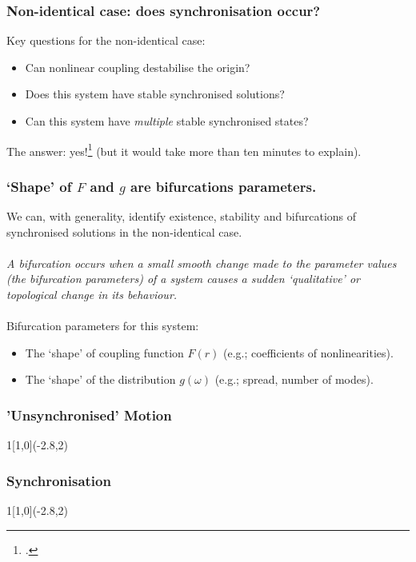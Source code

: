 \documentclass[10pt,reqno]{beamer}
\begin{document}
\begin{frame}
\frametitle{Non-identical case: does synchronisation occur?}
Key questions for the non-identical case:
\begin{itemize}
\item Can nonlinear coupling destabilise the origin?
\item Does this system have stable synchronised solutions?
\item Can this system have {\em multiple} stable synchronised states?
\end{itemize}
\vspace{10pt}
The answer: yes!\footcite{pc2015} (but it would take more than ten minutes to explain).
\end{frame}
\begin{frame}[t]
\frametitle{`Shape' of $F$ and $g$ are bifurcations parameters.}
We can, with generality, identify existence, stability and bifurcations of synchronised solutions in the non-identical case.\\~\\
{\em A bifurcation occurs when a small smooth change made to the parameter values (the bifurcation parameters) of a system causes a sudden `qualitative' or topological change in its behaviour.}
\\~\\
Bifurcation parameters for this system:
\begin{itemize}
\item The `shape' of coupling function $F(r)$ (e.g.; coefficients of nonlinearities).  
\item The `shape' of the distribution $g(\omega)$ (e.g.; spread, number of modes).
\end{itemize}
\end{frame}
\begin{frame}
\frametitle{'Unsynchronised' Motion}
\begin{textblock}{1}[1,0](-2.8,2)
\end{textblock}
\begin{figure}
\end{figure}
\end{frame}
\begin{frame}
\frametitle{Synchronisation}
\begin{textblock}{1}[1,0](-2.8,2)
\end{textblock}
\begin{figure}
\end{figure}
\end{frame}
\end{document}
